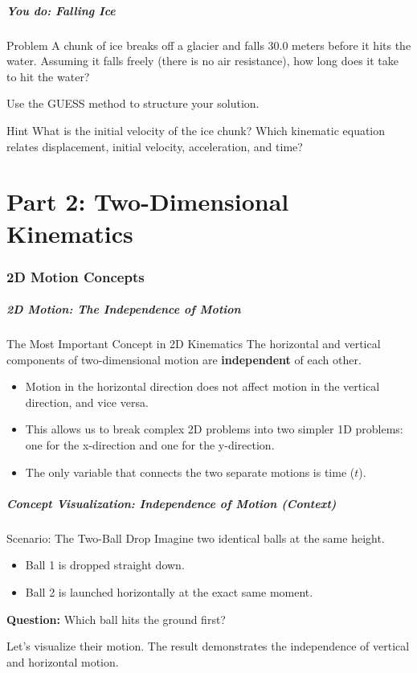 \documentclass{beamer}
\begin{document}
\begin{frame}
\frametitle{You do: Falling Ice}
\begin{block}{Problem}
A chunk of ice breaks off a glacier and falls 30.0 meters before it hits the water. Assuming it falls freely (there is no air resistance), how long does it take to hit the water?
\end{block}
\vfill
\begin{center}
    Use the GUESS method to structure your solution.
\end{center}
\vfill
\begin{alertblock}{Hint}
    What is the initial velocity of the ice chunk? Which kinematic equation relates displacement, initial velocity, acceleration, and time?
\end{alertblock}
\end{frame}

\part{Part 2: Two-Dimensional Kinematics}
\section{2D Motion Concepts}

\begin{frame}
\frametitle{2D Motion: The Independence of Motion}
\begin{block}{The Most Important Concept in 2D Kinematics}
The horizontal and vertical components of two-dimensional motion are \textbf{independent} of each other.
\end{block}
\begin{itemize}
    \item Motion in the horizontal direction does not affect motion in the vertical direction, and vice versa.
    \item This allows us to break complex 2D problems into two simpler 1D problems: one for the x-direction and one for the y-direction.
    \item The only variable that connects the two separate motions is \alert{time ($t$)}.
\end{itemize}
\end{frame}

\begin{frame}
\frametitle{Concept Visualization: Independence of Motion (Context)}
\begin{block}{Scenario: The Two-Ball Drop}
Imagine two identical balls at the same height.
\begin{itemize}
    \item Ball 1 is dropped straight down.
    \item Ball 2 is launched horizontally at the exact same moment.
\end{itemize}
\textbf{Question:} Which ball hits the ground first?
\end{block}
Let's visualize their motion. The result demonstrates the independence of vertical and horizontal motion.
\end{frame}
\end{document}
